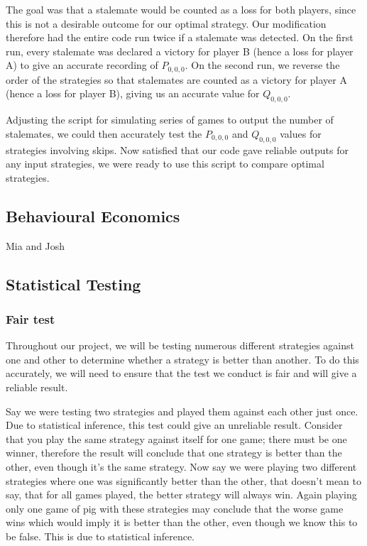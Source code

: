 \documentclass[a4paper,titlepage]{article}
\begin{document}
The goal was that a stalemate would be counted as a loss for both players, since this is not a desirable outcome for our optimal strategy. Our modification therefore had the entire code run twice if a stalemate was detected. On the first run, every stalemate was declared a victory for player B (hence a loss for player A) to give an accurate recording of $P_{0,0,0}$. On the second run, we reverse the order of the strategies so that stalemates are counted as a victory for player A (hence a loss for player B), giving us an accurate value for $Q_{0,0,0}$.

Adjusting the script for simulating series of games to output the number of stalemates, we could then accurately test the $P_{0,0,0}$ and $Q_{0,0,0}$ values for strategies involving skips. Now satisfied that our code gave reliable outputs for any input strategies, we were ready to use this script to compare optimal strategies.

\subsection{Behavioural Economics}
Mia and Josh

\subsection{Statistical Testing}
\subsubsection{Fair test}
Throughout our project, we will be testing numerous different strategies against one and other to determine whether a strategy is better than another. To do this accurately, we will need to ensure that the test we conduct is fair and will give a reliable result.

Say we were testing two strategies and played them against each other just once. Due to statistical inference, this test could give an unreliable result. Consider that you play the same strategy against itself for one game; there must be one winner, therefore the result will conclude that one strategy is better than the other, even though it’s the same strategy. Now say we were playing two different strategies where one was significantly better than the other, that doesn’t mean to say, that for all games played, the better strategy will always win. Again playing only one game of pig with these strategies may conclude that the worse game wins which would imply it is better than the other, even though we know this to be false. This is due to statistical inference.
\end{document}
